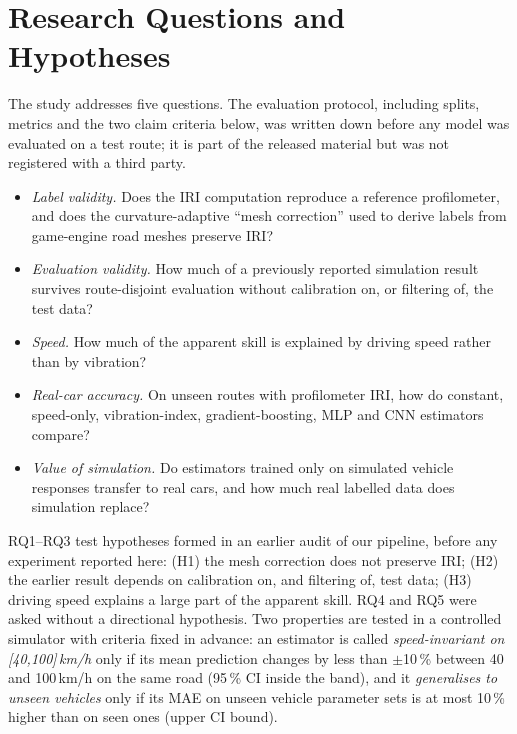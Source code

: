 \section{Research Questions and Hypotheses}
\label{sec:rq}
The study addresses five questions. The evaluation protocol, including splits, metrics and the two claim criteria below, was written down before any model was evaluated on a test route; it is part of the released material but was not registered with a third party.
\begin{itemize}
\item[\textbf{RQ1}] \emph{Label validity.} Does the IRI computation reproduce a reference profilometer, and does the curvature-adaptive ``mesh correction'' used to derive labels from game-engine road meshes preserve IRI?
\item[\textbf{RQ2}] \emph{Evaluation validity.} How much of a previously reported simulation result survives route-disjoint evaluation without calibration on, or filtering of, the test data?
\item[\textbf{RQ3}] \emph{Speed.} How much of the apparent skill is explained by driving speed rather than by vibration?
\item[\textbf{RQ4}] \emph{Real-car accuracy.} On unseen routes with profilometer IRI, how do constant, speed-only, vibration-index, gradient-boosting, MLP and CNN estimators compare?
\item[\textbf{RQ5}] \emph{Value of simulation.} Do estimators trained only on simulated vehicle responses transfer to real cars, and how much real labelled data does simulation replace?
\end{itemize}
RQ1--RQ3 test hypotheses formed in an earlier audit of our pipeline, before any experiment reported here: (H1) the mesh correction does not preserve IRI; (H2) the earlier result depends on calibration on, and filtering of, test data; (H3) driving speed explains a large part of the apparent skill.
RQ4 and RQ5 were asked without a directional hypothesis.
Two properties are tested in a controlled simulator with criteria fixed in advance: an estimator is called \emph{speed-invariant on [40,100]\,km/h} only if its mean prediction changes by less than $\pm$10\,\% between 40 and 100\,km/h on the same road (95\,\% CI inside the band), and it \emph{generalises to unseen vehicles} only if its MAE on unseen vehicle parameter sets is at most 10\,\% higher than on seen ones (upper CI bound).
